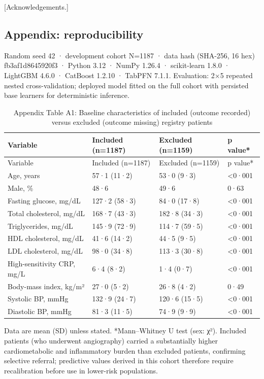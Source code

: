 \documentclass[
  english,
  11pt,
]{article}
\begin{document}
{[}Acknowledgements.{]}

\subsection{Appendix: reproducibility}\label{appendix-reproducibility}

Random seed 42 · development cohort N=1187 · data hash (SHA-256, 16 hex)
fb3af1d8645920f3 · Python 3.12 · NumPy 1.26.4 · scikit-learn 1.8.0 ·
LightGBM 4.6.0 · CatBoost 1.2.10 · TabPFN 7.1.1. Evaluation: 2×5
repeated nested cross-validation; deployed model fitted on the full
cohort with persisted base learners for deterministic inference.

\begin{longtable}[]{@{}llll@{}}
\caption{Appendix Table A1: Baseline characteristics of included
(outcome recorded) versus excluded (outcome missing) registry
patients}\tabularnewline
\toprule\noalign{}
Variable & Included (n=1187) & Excluded (n=1159) & p value* \\
\midrule\noalign{}
\endfirsthead
\toprule\noalign{}
Variable & Included (n=1187) & Excluded (n=1159) & p value* \\
\midrule\noalign{}
\endhead
\bottomrule\noalign{}
\endlastfoot
Age, years & 57·1 (11·2) & 53·0 (9·3) & \textless0·001 \\
Male, \% & 48·6 & 49·6 & 0·63 \\
Fasting glucose, mg/dL & 127·2 (58·3) & 84·0 (17·8) & \textless0·001 \\
Total cholesterol, mg/dL & 168·7 (43·3) & 182·8 (34·3) &
\textless0·001 \\
Triglycerides, mg/dL & 145·9 (72·9) & 114·7 (59·5) & \textless0·001 \\
HDL cholesterol, mg/dL & 41·6 (14·2) & 44·5 (9·5) & \textless0·001 \\
LDL cholesterol, mg/dL & 98·0 (34·8) & 113·3 (30·8) & \textless0·001 \\
High-sensitivity CRP, mg/L & 6·4 (8·2) & 1·4 (0·7) & \textless0·001 \\
Body-mass index, kg/m² & 27·0 (5·2) & 26·8 (4·2) & 0·49 \\
Systolic BP, mmHg & 132·9 (24·7) & 120·6 (15·5) & \textless0·001 \\
Diastolic BP, mmHg & 81·3 (11·5) & 74·9 (9·9) & \textless0·001 \\
\end{longtable}

Data are mean (SD) unless stated. *Mann--Whitney U test (sex: χ²).
Included patients (who underwent angiography) carried a substantially
higher cardiometabolic and inflammatory burden than excluded patients,
confirming selective referral; predictive values derived in this cohort
therefore require recalibration before use in lower-risk populations.
\end{document}
